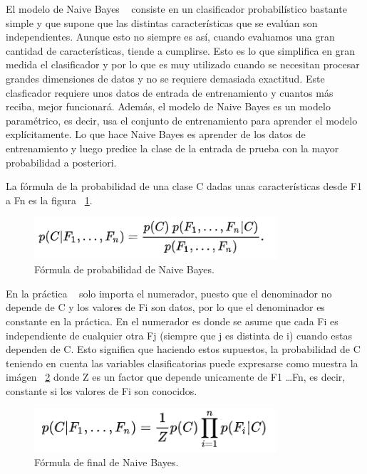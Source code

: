 \documentclass[a4paper, 12pt]{book}
\begin{document}
El modelo de Naive Bayes ~\cite{articulobayes} consiste en un clasificador probabilístico bastante simple y que supone que las distintas características que se evalúan son independientes. Aunque esto no siempre es así, cuando evaluamos una gran cantidad de características, tiende a cumplirse. Esto es lo que simplifica en gran medida el clasificador y por lo que es muy utilizado cuando se necesitan procesar grandes dimensiones de datos y no se requiere demasiada exactitud. Este clasficador requiere unos datos de entrada de entrenamiento y cuantos más reciba, mejor funcionará. Además, el modelo de Naive Bayes es un modelo paramétrico, es decir, usa el conjunto de entrenamiento para aprender el modelo explícitamente. Lo que hace Naive Bayes es aprender de los datos de entrenamiento y luego predice la clase de la entrada de prueba con la mayor probabilidad a posteriori.

La fórmula de la probabilidad de una clase C dadas unas características desde F1 a Fn es la figura ~\ref{fig:formulabayes}.

\begin{figure}
	\centering
	\includegraphics[width=9cm, keepaspectratio]{img/formulabayes}
	\caption{Fórmula de probabilidad de Naive Bayes.}
	\label{fig:formulabayes}
\end{figure}

En la práctica ~\cite{machinelearning} solo importa el numerador, puesto que el denominador no depende de C y los valores de Fi son datos, por lo que el denominador es constante en la práctica. En el numerador es donde se asume que cada Fi es independiente de cualquier otra Fj (siempre que j es distinta de i) cuando estas dependen de C. Esto significa que haciendo estos supuestos, la probabilidad de C teniendo en cuenta las variables clasificatorias puede expresarse como muestra la imágen ~\ref{fig:ffinalbayes} donde Z es un factor que depende unicamente de F1 \dots Fn, es decir, constante si los valores de Fi son conocidos.

\begin{figure}
  \centering
  \includegraphics[width=9cm, keepaspectratio]{img/ffinalbayes}
  \caption{Fórmula de final de Naive Bayes.}\label{fig:ffinalbayes}
\end{figure}
\end{document}
